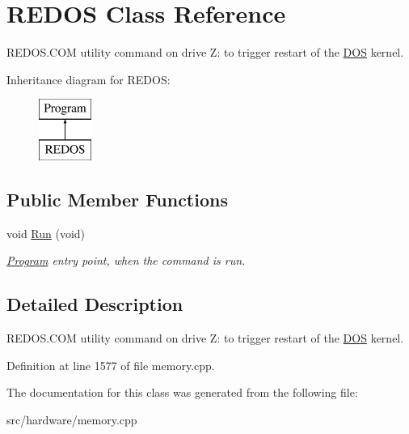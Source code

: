 \hypertarget{classREDOS}{\section{R\-E\-D\-O\-S Class Reference}
\label{classREDOS}
}


R\-E\-D\-O\-S.\-C\-O\-M utility command on drive Z\-: to trigger restart of the \hyperlink{classDOS}{D\-O\-S} kernel.  


Inheritance diagram for R\-E\-D\-O\-S\-:\begin{figure}[H]
\begin{center}
\leavevmode
\includegraphics[height=2.000000cm]{classREDOS}
\end{center}
\end{figure}
\subsection*{Public Member Functions}
\begin{DoxyCompactItemize}
\item 
\hypertarget{classREDOS_aa2d659599de1058d1b59069bfad7da76}{void \hyperlink{classREDOS_aa2d659599de1058d1b59069bfad7da76}{Run} (void)}\label{classREDOS_aa2d659599de1058d1b59069bfad7da76}

\begin{DoxyCompactList}\small\item\em \hyperlink{classProgram}{Program} entry point, when the command is run. \end{DoxyCompactList}\end{DoxyCompactItemize}


\subsection{Detailed Description}
R\-E\-D\-O\-S.\-C\-O\-M utility command on drive Z\-: to trigger restart of the \hyperlink{classDOS}{D\-O\-S} kernel. 

Definition at line 1577 of file memory.\-cpp.



The documentation for this class was generated from the following file\-:\begin{DoxyCompactItemize}
\item 
src/hardware/memory.\-cpp\end{DoxyCompactItemize}
